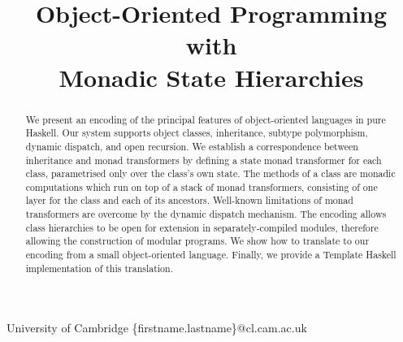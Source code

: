 \documentclass[authoryear,preprint]{sigplanconf}
\begin{document}
\setlength{\pdfpageheight}{\paperheight}
\setlength{\pdfpagewidth}{\paperwidth}





\preprintfooter{}   %

\title{Object-Oriented Programming with\\Monadic State Hierarchies}

           {University of Cambridge}
           {\{firstname.lastname\}@cl.cam.ac.uk}

\maketitle

\begin{abstract}
We present an encoding of the principal features of object-oriented languages in pure Haskell. Our system supports object classes, inheritance, subtype polymorphism, dynamic dispatch, and open recursion. We establish a correspondence between inheritance and monad transformers by defining a state monad transformer for each class, parametrised only over the class's own state. The methods of a class are monadic computations which run on top of a stack of monad transformers, consisting of one layer for the class and each of its ancestors. Well-known limitations of monad transformers are overcome by the dynamic dispatch mechanism. The encoding allows class hierarchies to be open for extension in separately-compiled modules, therefore allowing the construction of modular programs. We show how to translate to our encoding from a small object-oriented language. Finally, we provide a Template Haskell implementation of this translation.
\end{abstract}
\end{document}
